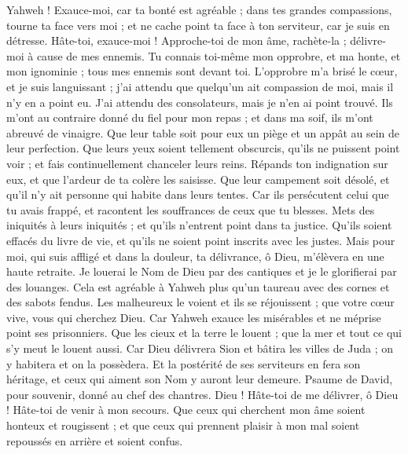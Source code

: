 \begin{multicols}{2}
Yahweh ! Exauce-moi, car ta bonté est agréable ; dans tes grandes compassions, tourne ta face vers moi ;
et ne cache point ta face à ton serviteur, car je suis en détresse. Hâte-toi, exauce-moi !
Approche-toi de mon âme, rachète-la ; délivre-moi à cause de mes ennemis.
Tu connais toi-même mon opprobre, et ma honte, et mon ignominie ; tous mes ennemis sont devant toi.
L'opprobre m'a brisé le cœur, et je suis languissant ; j'ai attendu que quelqu'un ait compassion de moi, mais il n'y en a point eu. J'ai attendu des consolateurs, mais je n'en ai point trouvé.
Ils m'ont au contraire donné du fiel pour mon repas ; et dans ma soif, ils m'ont abreuvé de vinaigre.
Que leur table soit pour eux un piège et un appât au sein de leur perfection.
Que leurs yeux soient tellement obscurcis, qu'ils ne puissent point voir ; et fais continuellement chanceler leurs reins.
Répands ton indignation sur eux, et que l'ardeur de ta colère les saisisse.
Que leur campement soit désolé, et qu'il n'y ait personne qui habite dans leurs tentes.
Car ils persécutent celui que tu avais frappé, et racontent les souffrances de ceux que tu blesses.
Mets des iniquités à leurs iniquités ; et qu'ils n'entrent point dans ta justice.
Qu'ils soient effacés du livre de vie, et qu'ils ne soient point inscrits avec les justes.
Mais pour moi, qui suis affligé et dans la douleur, ta délivrance, ô Dieu, m'élèvera en une haute retraite.
Je louerai le Nom de Dieu par des cantiques et je le glorifierai par des louanges.
Cela est agréable à Yahweh plus qu'un taureau avec des cornes et des sabots fendus.
Les malheureux le voient et ils se réjouissent ; que votre cœur vive, vous qui cherchez Dieu.
Car Yahweh exauce les misérables et ne méprise point ses prisonniers.
Que les cieux et la terre le louent ; que la mer et tout ce qui s'y meut le louent aussi.
Car Dieu délivrera Sion et bâtira les villes de Juda ; on y habitera et on la possèdera.
Et la postérité de ses serviteurs en fera son héritage, et ceux qui aiment son Nom y auront leur demeure.
\VerseOne{}Psaume de David, pour souvenir, donné au chef des chantres.
Dieu ! Hâte-toi de me délivrer, ô Dieu ! Hâte-toi de venir à mon secours.
Que ceux qui cherchent mon âme soient honteux et rougissent ; et que ceux qui prennent plaisir à mon mal soient repoussés en arrière et soient confus.

\end{multicols}
